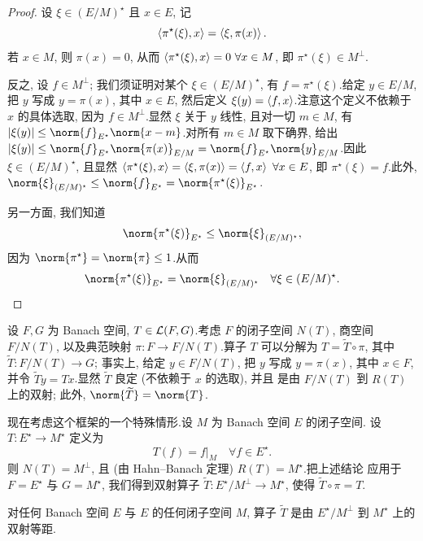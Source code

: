 \begin{proof}
设 $\xi\in(E/M)^\star$ 且 $x\in E$, 记
\begin{equation*}
\left\langle \pi^\star(\xi),x\right\rangle=\left\langle \xi,\pi(x)\right\rangle.
\end{equation*}
若 $x\in M$, 则 $\pi(x)=0$, 从而 $\left\langle \pi^\star(\xi),x\right\rangle=0\ \forall x\in M$,
即 $\pi^\star(\xi)\in M^\perp$.

反之, 设 $f\in M^\perp$; 我们须证明对某个 $\xi\in(E/M)^\star$, 有
$f=\pi^\star(\xi)$.给定 $y\in E/M$, 把 $y$ 写成 $y=\pi(x)$, 其中 $x\in E$,
然后定义 $\xi(y)=\left\langle f,x\right\rangle$.注意这个定义不依赖于 $x$ 的具体选取, 因为
$f\in M^\perp$.显然 $\xi$ 关于 $y$ 线性, 且对一切 $m\in M$, 有
$\abs{\xi(y)}\le\norm{f}_{E^\star}\norm{x-m}$.对所有 $m\in M$ 取下确界,
给出
$\abs{\xi(y)}\le\norm{f}_{E^\star}\norm{\pi(x)}_{E/M}
=\norm{f}_{E^\star}\norm{y}_{E/M}$.因此 $\xi\in(E/M)^\star$, 且显然
$\dual{\pi^\star(\xi)}{x}=\dual{\xi}{\pi(x)}=\dual{f}{x}\ \forall x\in E$,
即 $\pi^\star(\xi)=f$.此外,
$\norm{\xi}_{(E/M)^\star}\le\norm{f}_{E^\star}=\norm{\pi^\star(\xi)}_{E^\star}$.

另一方面, 我们知道
\begin{equation*}
\norm{\pi^\star(\xi)}_{E^\star}\le\norm{\xi}_{(E/M)^\star},
\end{equation*}
因为 $\norm{\pi^\star}=\norm{\pi}\le1$.从而
\begin{equation*}
\norm{\pi^\star(\xi)}_{E^\star}=\norm{\xi}_{(E/M)^\star}
\quad\forall\xi\in(E/M)^\star.
\end{equation*}
\end{proof}

设 $F,G$ 为 Banach 空间, $T\in\mathcal{L}(F,G)$.考虑 $F$ 的闭子空间 $N(T)$,
商空间 $F/N(T)$, 以及典范映射 $\pi:F\to F/N(T)$.算子 $T$ 可以分解为
$T=\widetilde T\circ\pi$, 其中 $\widetilde T:F/N(T)\to G$; 事实上, 给定
$y\in F/N(T)$, 把 $y$ 写成 $y=\pi(x)$, 其中 $x\in F$, 并令
$\widetilde Ty=Tx$.显然 $\widetilde T$ 良定 (不依赖于 $x$ 的选取), 并且
是由 $F/N(T)$ 到 $R(T)$ 上的双射; 此外, $\norm{\widetilde T}=\norm{T}$.

现在考虑这个框架的一个特殊情形.设 $M$ 为 Banach 空间 $E$ 的闭子空间.
设 $T:E^\star\to M^\star$ 定义为
\begin{equation*}
T(f)=f|_M\quad\forall f\in E^\star.
\end{equation*}
则 $N(T)=M^\perp$, 且 (由 Hahn--Banach 定理) $R(T)=M^\star$.把上述结论
应用于 $F=E^\star$ 与 $G=M^\star$, 我们得到双射算子
$\widetilde T:E^\star/M^\perp\to M^\star$, 使得 $\widetilde T\circ\pi=T$.

\begin{proposition}
\label{prop:11.10}
对任何 Banach 空间 $E$ 与 $E$ 的任何闭子空间 $M$, 算子 $\widetilde T$ 是由
$E^\star/M^\perp$ 到 $M^\star$ 上的双射等距.
\end{proposition}

